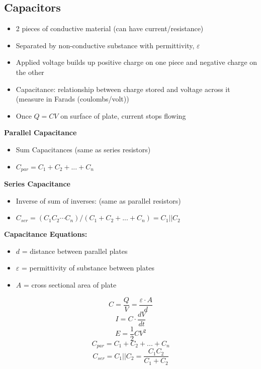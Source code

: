 \documentclass{article}\usepackage{amsmath,amssymb,amsthm,tikz,tkz-graph,color,chngpage,soul,hyperref,csquotes,graphicx,floatrow}\newcommand*{\QEDB}{\hfill\ensuremath{\square}}\newtheorem*{prop}{Proposition}\renewcommand{\theenumi}{\alph{enumi}}\usepackage[shortlabels]{enumitem}\usepackage[nobreak=true]{mdframed}\usetikzlibrary{matrix,calc}\MakeOuterQuote{"}\usepackage[margin=0.75in]{geometry} \newtheorem{theorem}{Theorem}
\begin{document}
\subsection*{Capacitors}
\begin{itemize}
    \item 2 pieces of conductive material (can have current/resistance)
    \item Separated by non-conductive substance with permittivity, $\varepsilon$
    \item Applied voltage builds up positive charge on one piece and negative charge on the other
    \item Capacitance: relationship between charge stored and voltage across it (measure in Farads (coulombs/volt))
    \item Once $Q = CV$ on surface of plate, current stops flowing
\end{itemize}
\textbf{Parallel Capacitance}
\begin{itemize}
    \item Sum Capacitances (same as series resistors)
    \item $C_{par} = C_1 + C_2 + ... + C_n$
\end{itemize}
\textbf{Series Capacitance}
\begin{itemize}
    \item Inverse of sum of inverses: (same as parallel resistors)
    \item $C_{ser} = (C_1C_2 \cdots C_n) / (C_1 + C_2 + ... + C_n) = C_1 || C_2$
\end{itemize}
\begin{mdframed}
\textbf{Capacitance Equations:}
\begin{itemize}
    \item $d$ = distance between parallel plates
    \item $\varepsilon$ = permittivity of substance between plates
    \item $A$ = cross sectional area of plate
\end{itemize}
\begin{equation}C = \frac{Q}{V} = \frac{\varepsilon \cdot A}{d}\end{equation}
\begin{equation}I = C \cdot \frac{dV}{dt}\end{equation}
\begin{equation}E = \frac{1}{2}CV^2\end{equation}
\begin{equation}C_{par} = C_1 + C_2 + ... + C_n\end{equation}
\begin{equation}C_{ser} = C_1 || C_2 = \frac{C_1C_2}{C_1 + C_2}\end{equation}
\end{mdframed}
\end{document}
